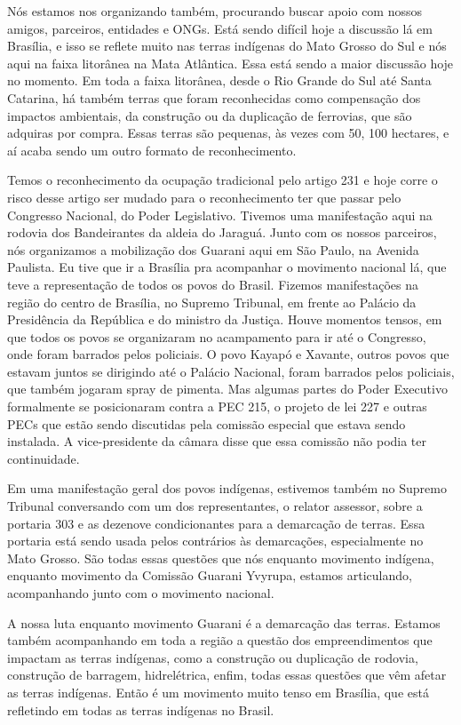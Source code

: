 Nós estamos nos organizando também, procurando buscar apoio com nossos
amigos, parceiros, entidades e ONGs. Está sendo difícil hoje a discussão
lá em Brasília, e isso se reflete muito nas terras indígenas do Mato
Grosso do Sul e nós aqui na faixa litorânea na Mata Atlântica. Essa está
sendo a maior discussão hoje no momento. Em toda a faixa litorânea,
desde o Rio Grande do Sul até Santa Catarina, há também terras que foram
reconhecidas como compensação dos impactos ambientais, da construção ou
da duplicação de ferrovias, que são adquiras por compra. Essas terras
são pequenas, às vezes com 50, 100 hectares, e aí acaba sendo um outro
formato de reconhecimento.

Temos o reconhecimento da ocupação tradicional pelo artigo 231 e hoje
corre o risco desse artigo ser mudado para o reconhecimento ter que
passar pelo Congresso Nacional, do Poder Legislativo. Tivemos uma
manifestação aqui na rodovia dos Bandeirantes da aldeia do Jaraguá.
Junto com os nossos parceiros, nós organizamos a mobilização dos Guarani
aqui em São Paulo, na Avenida Paulista. Eu tive que ir a Brasília pra
acompanhar o movimento nacional lá, que teve a representação de todos os
povos do Brasil. Fizemos manifestações na região do centro de Brasília,
no Supremo Tribunal, em frente ao Palácio da Presidência da República e
do ministro da Justiça. Houve momentos tensos, em que todos os povos se
organizaram no acampamento para ir até o Congresso, onde foram barrados
pelos policiais. O povo Kayapó e Xavante, outros povos que estavam
juntos se dirigindo até o Palácio Nacional, foram barrados pelos
policiais, que também jogaram spray de pimenta. Mas algumas partes do
Poder Executivo formalmente se posicionaram contra a PEC 215, o projeto
de lei 227 e outras PECs que estão sendo discutidas pela comissão
especial que estava sendo instalada. A vice-presidente da câmara disse
que essa comissão não podia ter continuidade.

Em uma manifestação geral dos povos indígenas, estivemos também no
Supremo Tribunal conversando com um dos representantes, o relator
assessor, sobre a portaria 303 e as dezenove condicionantes para a
demarcação de terras. Essa portaria está sendo usada pelos contrários às
demarcações, especialmente no Mato Grosso. São todas essas questões que
nós enquanto movimento indígena, enquanto movimento da Comissão Guarani
Yvyrupa, estamos articulando, acompanhando junto com o movimento
nacional.

A nossa luta enquanto movimento Guarani é a demarcação das terras.
Estamos também acompanhando em toda a região a questão dos
empreendimentos que impactam as terras indígenas, como a construção ou
duplicação de rodovia, construção de barragem, hidrelétrica, enfim,
todas essas questões que vêm afetar as terras indígenas. Então é um
movimento muito tenso em Brasília, que está refletindo em todas as
terras indígenas no Brasil.

